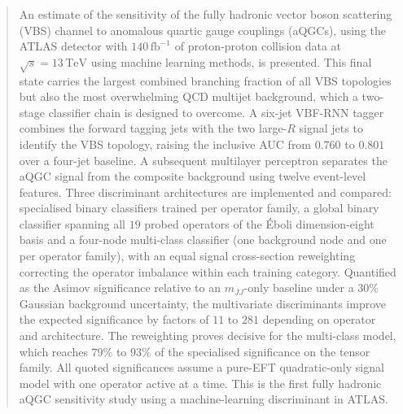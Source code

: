 \documentclass[11pt]{report}
\begin{document}
\begin{abstract}
\thispagestyle{plain}
\noindent An estimate of the sensitivity of the fully hadronic vector boson scattering (VBS) channel to anomalous quartic gauge couplings (aQGCs), using the ATLAS detector with $140\,\mathrm{fb}^{-1}$ of proton-proton collision data at $\sqrt{s}=13\,\mathrm{TeV}$ using machine learning methods, is presented. This final state carries the largest combined branching fraction of all VBS topologies but also the most overwhelming QCD multijet background, which a two-stage classifier chain is designed to overcome. A six-jet VBF-RNN tagger combines the forward tagging jets with the two large-$R$ signal jets to identify the VBS topology, raising the inclusive AUC from $0.760$ to $0.801$ over a four-jet baseline. A subsequent multilayer perceptron separates the aQGC signal from the composite background using twelve event-level features. Three discriminant architectures are implemented and compared: specialised binary classifiers trained per operator family, a global binary classifier spanning all $19$ probed operators of the Éboli dimension-eight basis and a four-node multi-class classifier (one background node and one per operator family), with an equal signal cross-section reweighting correcting the operator imbalance within each training category. Quantified as the Asimov significance relative to an $m_{JJ}$-only baseline under a $30\%$ Gaussian background uncertainty, the multivariate discriminants improve the expected significance by factors of $11$ to $281$ depending on operator and architecture. The reweighting proves decisive for the multi-class model, which reaches $79\%$ to $93\%$ of the specialised significance on the tensor family. All quoted significances assume a pure-EFT quadratic-only signal model with one operator active at a time. This is the first fully hadronic aQGC sensitivity study using a machine-learning discriminant in ATLAS.
\end{abstract}

\clearpage
\setcounter{page}{2}
\tableofcontents
\clearpage
{}


\newpage






















\end{document}
